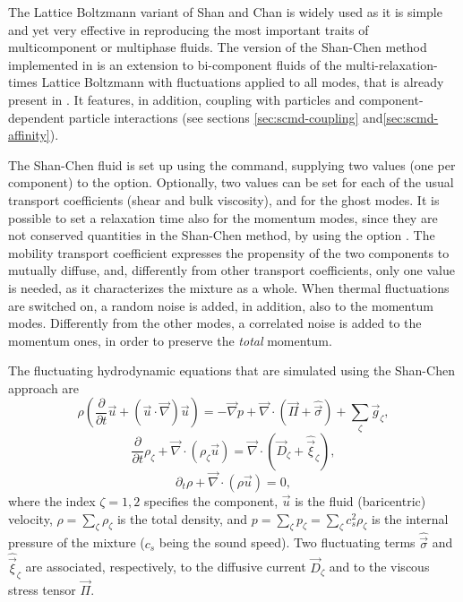 The Lattice Boltzmann variant of Shan and Chan\cite{shan93a} is widely
used as it is simple and yet very effective in reproducing the most
important traits of multicomponent or multiphase fluids. The version
of the Shan-Chen method implemented in \es is an extension to
bi-component fluids of the multi-relaxation-times Lattice Boltzmann
with fluctuations applied to all modes, that is already present in
\es. It features, in addition, coupling with particles\cite{sega13c}
and component-dependent particle interactions (see sections
\ref{sec:scmd-coupling} and\ref{sec:scmd-affinity}).

The Shan-Chen fluid is set up using the  command, supplying two
values (one per component) to the  option. Optionally, two values can
be set for each of the usual transport coefficients  (shear and bulk
viscosity), and for the ghost modes. It is possible to set a relaxation time
also for the momentum modes, since they are not conserved quantities in the
Shan-Chen method, by using the option . The mobility transport
coefficient expresses the propensity of the two components to mutually diffuse,
and, differently from other transport coefficients, only one value is needed,
as it characterizes the mixture as a whole. When thermal fluctuations are
switched on, a random noise is added, in addition, also to the momentum modes.
Differently from the other modes, a correlated noise is added to the momentum
ones, in order to preserve the \emph{total} momentum. 


The fluctuating hydrodynamic equations that are simulated using the
Shan-Chen approach are
\begin{equation}\label{eq:shanchen-NS}
\rho \left(\frac{\partial }{\partial  t} {\vec {u}} + ({\vec {u}}\cdot {\vec {\nabla}})  {\vec {u}} \right)=-{\vec {\nabla}} p+{\vec {\nabla}} \cdot ({\vec {\Pi}}+\hat{{\vec {\sigma}}})+\sum_{\zeta} {\vec {g}}_{\zeta},
\end{equation}
\begin{equation}\label{eq:shanchen-cont}
\frac{\partial }{\partial  t} \rho_{\zeta}+{\vec {\nabla}} \cdot (\rho_{\zeta} {\vec {u}}) = {\vec {\nabla}} \cdot  ({\vec {D}}_{\zeta}+\hat{{\vec {\xi}}}_{\zeta}),
\end{equation}
\begin{equation}\label{eq:shanchen-globalcont}
\partial_t \rho+{\vec {\nabla}} \cdot (\rho {\vec {u}}) = 0,
\end{equation}
where the index $\zeta=1,2$ specifies the component, $\vec{u}$ is
the fluid (baricentric) velocity, $\rho=\sum_\zeta\rho_\zeta$ is
the total density, and $p=\sum_{\zeta} p_{\zeta}=\sum_{\zeta} c_s^2
\rho_{\zeta}$ is the internal pressure of the mixture ($c_s$ being
the sound speed). Two fluctuating terms $\hat{{\vec{\sigma}}}$ and
$\hat{{\vec{\xi}}}_{\zeta}$ are associated, respectively, to the
diffusive current ${\vec{D}}_{\zeta}$ and to the viscous stress
tensor ${\vec{\Pi}}$.

